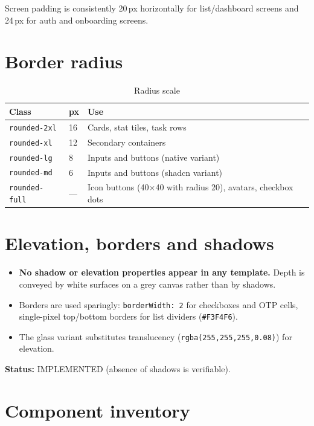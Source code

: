 Screen padding is consistently 20\,px horizontally for list/dashboard screens and
24\,px for auth and onboarding screens.

\section{Border radius}

\begin{table}[H]
\centering
\caption{Radius scale}
\begin{tabular}{@{}L{3.4cm}L{2.2cm}L{8.2cm}@{}}
\toprule
\textbf{Class} & \textbf{px} & \textbf{Use} \\
\midrule
\texttt{rounded-2xl} & 16 & Cards, stat tiles, task rows \\
\texttt{rounded-xl} & 12 & Secondary containers \\
\texttt{rounded-lg} & 8 & Inputs and buttons (native variant) \\
\texttt{rounded-md} & 6 & Inputs and buttons (shadcn variant) \\
\texttt{rounded-full} & --- & Icon buttons (40$\times$40 with radius 20), avatars,
checkbox dots \\
\bottomrule
\end{tabular}
\end{table}

\section{Elevation, borders and shadows}

\begin{itemize}
  \item \textbf{No shadow or elevation properties appear in any template.} Depth is
        conveyed by white surfaces on a grey canvas rather than by shadows.
  \item Borders are used sparingly: \texttt{borderWidth: 2} for checkboxes and OTP
        cells, single-pixel top/bottom borders for list dividers
        (\texttt{\#F3F4F6}).
  \item The glass variant substitutes translucency
        (\texttt{rgba(255,255,255,0.08)}) for elevation.
\end{itemize}

\textbf{Status:} IMPLEMENTED (absence of shadows is verifiable).

\section{Component inventory}

